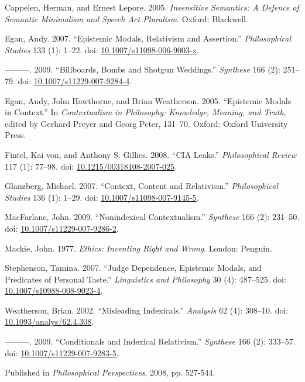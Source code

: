 \documentclass[
  10pt,
  letterpaper,
  DIV=11,
  numbers=noendperiod,
  twoside]{scrartcl}
\newlength{\cslhangindent}
\newenvironment{CSLReferences}[2] %
 {\begin{list}{}{%
  \setlength{\itemindent}{0pt}
  \setlength{\leftmargin}{0pt}
  \setlength{\parsep}{0pt}
  \ifodd #1
   \setlength{\leftmargin}{\cslhangindent}
   \setlength{\itemindent}{-1\cslhangindent}
  \fi
  \setlength{\itemsep}{#2\baselineskip}}}
 {\end{list}}
\begin{document}
\label{refs}
\begin{CSLReferences}{1}{0}
Cappelen, Herman, and Ernest Lepore. 2005. \emph{Insensitive Semantics:
A Defence of Semantic Minimalism and Speech Act Pluralism}. Oxford:
Blackwell.

Egan, Andy. 2007. {``{Epistemic Modals, Relativism and Assertion}.''}
\emph{Philosophical Studies} 133 (1): 1--22. doi:
\href{https://doi.org/10.1007/s11098-006-9003-x}{10.1007/s11098-006-9003-x}.

---------. 2009. {``{Billboards, Bombs and Shotgun Weddings}.''}
\emph{Synthese} 166 (2): 251--79. doi:
\href{https://doi.org/10.1007/s11229-007-9284-4}{10.1007/s11229-007-9284-4}.

Egan, Andy, John Hawthorne, and Brian Weatherson. 2005. {``{Epistemic
Modals in Context}.''} In \emph{Contextualism in Philosophy: Knowledge,
Meaning, and Truth}, edited by Gerhard Preyer and Georg Peter, 131--70.
Oxford: Oxford University Press.

Fintel, Kai von, and Anthony S. Gillies. 2008. {``CIA Leaks.''}
\emph{Philosophical Review} 117 (1): 77--98. doi:
\href{https://doi.org/10.1215/00318108-2007-025}{10.1215/00318108-2007-025}.

Glanzberg, Michael. 2007. {``Context, Content and Relativism.''}
\emph{Philosophical Studies} 136 (1): 1--29. doi:
\href{https://doi.org/10.1007/s11098-007-9145-5}{10.1007/s11098-007-9145-5}.

MacFarlane, John. 2009. {``{Nonindexical Contextualism}.''}
\emph{Synthese} 166 (2): 231--50. doi:
\href{https://doi.org/10.1007/s11229-007-9286-2}{10.1007/s11229-007-9286-2}.

Mackie, John. 1977. \emph{Ethics: Inventing Right and Wrong}. London:
Penguin.

Stephenson, Tamina. 2007. {``Judge Dependence, Epistemic Modals, and
Predicates of Personal Taste.''} \emph{Linguistics and Philosophy} 30
(4): 487--525. doi:
\href{https://doi.org/10.1007/s10988-008-9023-4}{10.1007/s10988-008-9023-4}.

Weatherson, Brian. 2002. {``Misleading Indexicals.''} \emph{Analysis} 62
(4): 308--10. doi:
\href{https://doi.org/10.1093/analys/62.4.308}{10.1093/analys/62.4.308}.

---------. 2009. {``{Conditionals and Indexical Relativism}.''}
\emph{Synthese} 166 (2): 333--57. doi:
\href{https://doi.org/10.1007/s11229-007-9283-5}{10.1007/s11229-007-9283-5}.

\end{CSLReferences}



\noindent Published in\emph{
Philosophical Perspectives}, 2008, pp. 527-544.
\end{document}
